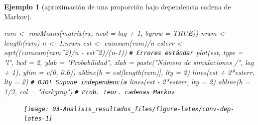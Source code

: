 \documentclass[
  10pt,
]{book}
\newenvironment{Shaded}{\begin{snugshade}}{\end{snugshade}}
\newcommand{\AttributeTok}[1]{\textcolor[rgb]{0.77,0.63,0.00}{#1}}
\newcommand{\CommentTok}[1]{\textcolor[rgb]{0.56,0.35,0.01}{\textit{#1}}}
\newcommand{\ConstantTok}[1]{\textcolor[rgb]{0.00,0.00,0.00}{#1}}
\newcommand{\DecValTok}[1]{\textcolor[rgb]{0.00,0.00,0.81}{#1}}
\newcommand{\FloatTok}[1]{\textcolor[rgb]{0.00,0.00,0.81}{#1}}
\newcommand{\FunctionTok}[1]{\textcolor[rgb]{0.00,0.00,0.00}{#1}}
\newcommand{\NormalTok}[1]{#1}
\newcommand{\OtherTok}[1]{\textcolor[rgb]{0.56,0.35,0.01}{#1}}
\newcommand{\SpecialCharTok}[1]{\textcolor[rgb]{0.00,0.00,0.00}{#1}}
\newcommand{\StringTok}[1]{\textcolor[rgb]{0.31,0.60,0.02}{#1}}
\theoremstyle{break}
\newtheorem{example}{Ejemplo}[chapter]
\theoremstyle{nonumberplain}
\renewcommand{\CommentTok}[1]{\textcolor[rgb]{0.41,0.41,0.41}{\texttt{#1}}}
\begin{document}
\begin{example}[aproximación de una proporción bajo dependencia cadena de Markov]
\begin{Shaded}
\begin{Highlighting}[]
\NormalTok{rxm }\OtherTok{\textless{}{-}} \FunctionTok{rowMeans}\NormalTok{(}\FunctionTok{matrix}\NormalTok{(rx, }\AttributeTok{ncol =}\NormalTok{ lag }\SpecialCharTok{+} \DecValTok{1}\NormalTok{, }\AttributeTok{byrow =} \ConstantTok{TRUE}\NormalTok{))}
\NormalTok{nrxm }\OtherTok{\textless{}{-}} \FunctionTok{length}\NormalTok{(rxm)}
\NormalTok{n }\OtherTok{\textless{}{-}} \DecValTok{1}\SpecialCharTok{:}\NormalTok{nrxm}
\NormalTok{est }\OtherTok{\textless{}{-}} \FunctionTok{cumsum}\NormalTok{(rxm)}\SpecialCharTok{/}\NormalTok{n}
\NormalTok{esterr }\OtherTok{\textless{}{-}} \FunctionTok{sqrt}\NormalTok{((}\FunctionTok{cumsum}\NormalTok{(rxm}\SpecialCharTok{\^{}}\DecValTok{2}\NormalTok{)}\SpecialCharTok{/}\NormalTok{n }\SpecialCharTok{{-}}\NormalTok{ est}\SpecialCharTok{\^{}}\DecValTok{2}\NormalTok{)}\SpecialCharTok{/}\NormalTok{(n}\DecValTok{{-}1}\NormalTok{)) }\CommentTok{\# Errores estándar}
\FunctionTok{plot}\NormalTok{(est, }\AttributeTok{type =} \StringTok{"l"}\NormalTok{, }\AttributeTok{lwd =} \DecValTok{2}\NormalTok{, }\AttributeTok{ylab =} \StringTok{"Probabilidad"}\NormalTok{,  }
     \AttributeTok{xlab =} \FunctionTok{paste}\NormalTok{(}\StringTok{"Número de simulaciones /"}\NormalTok{, lag }\SpecialCharTok{+} \DecValTok{1}\NormalTok{), }\AttributeTok{ylim =} \FunctionTok{c}\NormalTok{(}\DecValTok{0}\NormalTok{, }\FloatTok{0.6}\NormalTok{))}
\FunctionTok{abline}\NormalTok{(}\AttributeTok{h =}\NormalTok{ est[}\FunctionTok{length}\NormalTok{(rxm)], }\AttributeTok{lty =} \DecValTok{2}\NormalTok{)}
\FunctionTok{lines}\NormalTok{(est }\SpecialCharTok{+} \DecValTok{2}\SpecialCharTok{*}\NormalTok{esterr, }\AttributeTok{lty =} \DecValTok{2}\NormalTok{) }\CommentTok{\# OJO! Supone independencia}
\FunctionTok{lines}\NormalTok{(est }\SpecialCharTok{{-}} \DecValTok{2}\SpecialCharTok{*}\NormalTok{esterr, }\AttributeTok{lty =} \DecValTok{2}\NormalTok{)}
\FunctionTok{abline}\NormalTok{(}\AttributeTok{h =} \DecValTok{1}\SpecialCharTok{/}\DecValTok{3}\NormalTok{, }\AttributeTok{col =} \StringTok{"darkgray"}\NormalTok{)     }\CommentTok{\# Prob. teor. cadenas Markov}
\end{Highlighting}
\end{Shaded}

\begin{figure}[!htbp]

{\centering \texttt{[image: 03-Analisis\_resultados\_files/figure-latex/conv-dep-lotes-1]} 

}
\end{figure}
\end{example}
\end{document}
